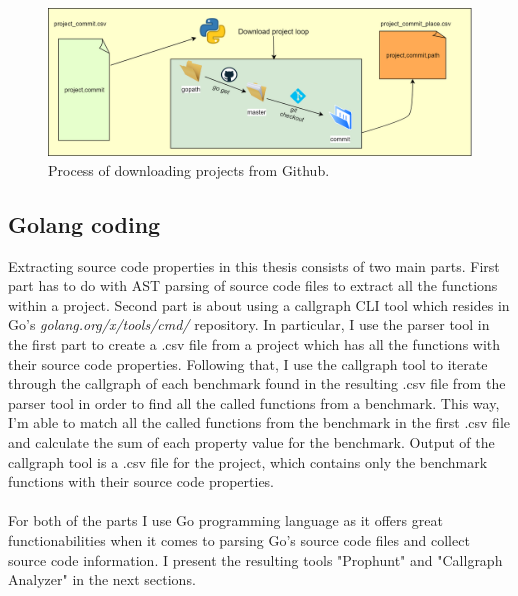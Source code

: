 \documentclass{seal_thesis}
\begin{document}
\begin{figure}[H]
	\centering
	\includegraphics[width=\linewidth]{downloadproject}
	\caption{Process of downloading projects from Github.}
	\label{fig:downloadproject}
\end{figure}


\subsection{Golang coding}

Extracting source code properties in this thesis consists of two main parts. First part has to do with AST parsing of source code files to extract all the functions within a project. Second part is about using a callgraph CLI tool which resides in Go's \textit{golang.org/x/tools/cmd/} repository\cite{callgraphtool}. In particular, I use the parser tool in the first part to create a .csv file from a project which has all the functions with their source code properties. Following that, I use the callgraph tool to iterate through the callgraph of each benchmark found in the resulting .csv file from the parser tool in order to find all the called functions from a benchmark. This way, I'm able to match all the called functions from the benchmark in the first .csv file and calculate the sum of each property value for the benchmark. Output of the callgraph tool is a .csv file for the project, which contains only the benchmark functions with their source code properties.\\
\\
For both of the parts I use Go programming language as it offers great functionabilities when it comes to parsing Go's source code files and collect source code information. I present the resulting tools "Prophunt" and "Callgraph Analyzer" in the next sections.
\end{document}
